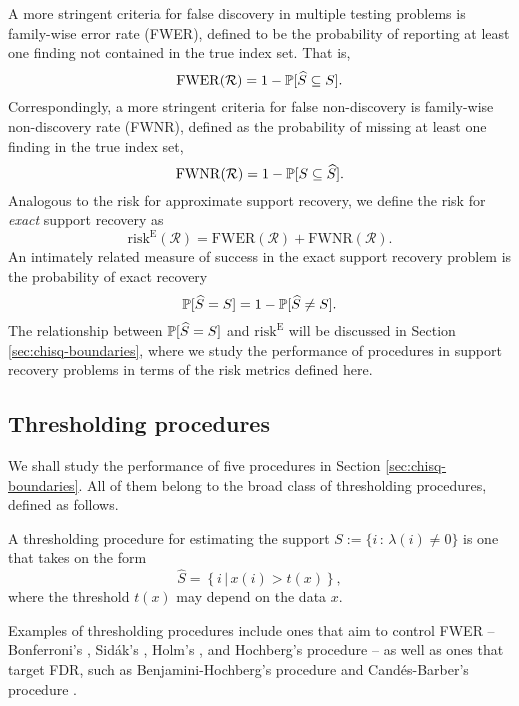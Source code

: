 A more stringent criteria for false discovery in multiple testing problems is family-wise error rate (FWER), defined to be the probability of reporting at least one finding not contained in the true index set.
That is,
\begin{equation} \label{eq:FWER}
    \mathrm{FWER}(\mathcal{R}) = 1 - \P[\widehat{S} \subseteq S].
\end{equation}
Correspondingly, a more stringent criteria for false non-discovery is family-wise non-discovery rate (FWNR), defined as the probability of missing at least one finding in the true index set,
\begin{equation} \label{eq:FWNDR}
    \mathrm{FWNR}(\mathcal{R}) = 1 - \P[S \subseteq \widehat{S}].
\end{equation}
Analogous to the risk for approximate support recovery, we define the risk for \emph{exact} support recovery as
\begin{equation} \label{eq:risk-exact}
    \mathrm{risk}^{\mathrm{E}}(\mathcal{R}) = \mathrm{FWER}(\mathcal{R}) + \mathrm{FWNR}(\mathcal{R}).
\end{equation}
An intimately related measure of success in the exact support recovery problem is the probability of exact recovery 
\begin{equation} \label{eq:risk-prob}
    \P[\widehat{S} = S] = 1 - \P[\widehat{S} \neq S].
\end{equation}
The relationship between $\P[\widehat{S} = S]$ and $\mathrm{risk}^{\mathrm{E}}$ will be discussed in Section \ref{sec:chisq-boundaries}, where we study the performance of procedures in support recovery problems in terms of the risk metrics defined here.

\subsection{Thresholding procedures}
\label{subsec:thresholding-procedures}

We shall study the performance of five procedures in Section \ref{sec:chisq-boundaries}.
All of them belong to the broad class of thresholding procedures, defined as follows.
\begin{definition}
A thresholding procedure for estimating the support 
$S:=\{i\, :\, \lambda(i)\neq0\}$ is one that takes on the form
\begin{equation} \label{eq:thresholding-procedure}
    \widehat{S} = \left\{i\,|\,x(i) > t(x)\right\},
\end{equation}
where the threshold $t(x)$ may depend on the data $x$.
\end{definition}
Examples of thresholding procedures include ones that aim to control FWER -- Bonferroni's \cite{dunn1961multiple}, Sid\'ak's \citep{vsidak1967rectangular}, Holm's \citep{holm1979simple}, and Hochberg's procedure \citep{hochberg1988sharper} -- as well as ones that target FDR, such as Benjamini-Hochberg's procedure \cite{benjamini1995controlling} and Cand\'es-Barber's procedure \cite{barber2015controlling}.

